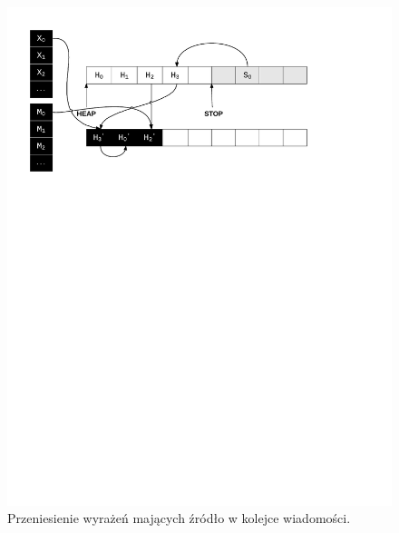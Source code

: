 \begin{figure}[p]
\centerline{\includegraphics[scale=0.75, clip, trim=10mm 185mm 45mm 10mm]{gc_3}}
\caption{Przeniesienie wyrażeń mających źródło w kolejce wiadomości.}
\label{fig:gc3}


\end{figure}
